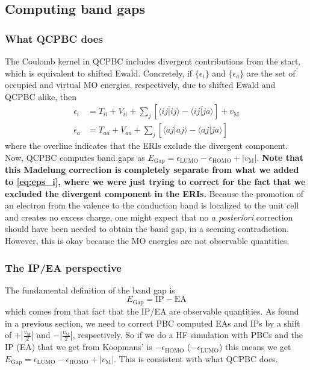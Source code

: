 \subsection{Computing band gaps}
\subsubsection{What QCPBC does}
The Coulomb kernel in QCPBC includes divergent contributions from the start, which is equivalent to shifted Ewald. Concretely, if $\{\epsilon_i\}$ and $\{\epsilon_a\}$ are the set of occupied and virtual MO energies, respectively, due to shifted Ewald and QCPBC alike, then
\begin{align}
\epsilon_i &= T_{i i}+V_{i i}+\sum_j[\overline{\langle i j | i j\rangle}-\overline{\langle i j | j a\rangle}]+v_{\mathrm{M}} 
\label{eq:eps_i}\\
\epsilon_a &= T_{a a}+V_{a a}+\sum_j[\overline{\langle a j | a j\rangle}-\overline{\langle a j | j a\rangle}]
\end{align}
where the overline indicates that the ERIs exclude the divergent component. Now, QCPBC computes band gaps as $E_{\text{Gap}}=\epsilon_{\text{LUMO} } - \epsilon_{\text{HOMO}} + |v_{\mathrm{M}}|$. \textbf{Note that this Madelung correction is completely separate from what we added to \ref{eq:eps_i}, where we were just trying to correct for the fact that we excluded the divergent component in the ERIs.} Because the promotion of an electron from the valence to the conduction band is localized to the unit cell and creates no excess charge, one might expect that no \emph{a posteriori} correction should have been needed to obtain the band gap, in a seeming contradiction. However, this is okay because the MO energies are not observable quantities.
\subsubsection{The IP/EA perspective}
The fundamental definition of the band gap is
\begin{equation}
    E_{\text{Gap}} = \text{IP} - \text{EA}
\end{equation}
which comes from that fact that the IP/EA are observable quantities. As found in a previous section, we need to correct PBC computed EAs and IPs by a shift of $+|\frac{v_{\mathrm{M}}}{2}|$ and $-|\frac{v_{\mathrm{M}}}{2}|$, respectively. So if we do a HF simulation with PBCs and the IP (EA) that we get from Koopmans' is $-\epsilon_{\text{HOMO}}$ ($-\epsilon _{\text{LUMO}}$) this means we get $E_{\text{Gap}} = \epsilon _{\text{LUMO}} - \epsilon _{\text{HOMO}} + |v_{\mathrm{M}}|$. This is consistent with what QCPBC does.

